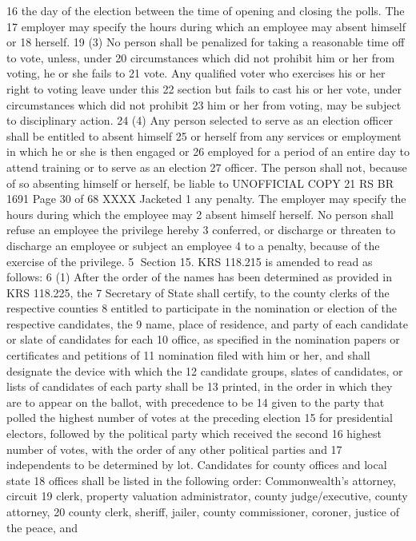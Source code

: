 16 the day of the election between the time of opening and closing the polls. The
17 employer may specify the hours during which an employee may absent himself or
18 herself.
19 (3) No person shall be penalized for taking a reasonable time off to vote, unless, under
20 circumstances which did not prohibit him or her from voting, he or she fails to
21 vote. Any qualified voter who exercises his or her right to voting leave under this
22 section but fails to cast his or her vote, under circumstances which did not prohibit
23 him or her from voting, may be subject to disciplinary action.
24 (4) Any person selected to serve as an election officer shall be entitled to absent himself
25 or herself from any services or employment in which he or she is then engaged or
26 employed for a period of an entire day to attend training or to serve as an election
27 officer. The person shall not, because of so absenting himself or herself, be liable to 
UNOFFICIAL COPY 21 RS BR 1691
Page 30 of 68
XXXX Jacketed
1 any penalty. The employer may specify the hours during which the employee may
2 absent himself herself. No person shall refuse an employee the privilege hereby
3 conferred, or discharge or threaten to discharge an employee or subject an employee
4 to a penalty, because of the exercise of the privilege.
5 Section 15. KRS 118.215 is amended to read as follows:
6 (1) After the order of the names has been determined as provided in KRS 118.225, the
7 Secretary of State shall certify, to the county clerks of the respective counties
8 entitled to participate in the nomination or election of the respective candidates, the
9 name, place of residence, and party of each candidate or slate of candidates for each
10 office, as specified in the nomination papers or certificates and petitions of
11 nomination filed with him or her, and shall designate the device with which the
12 candidate groups, slates of candidates, or lists of candidates of each party shall be
13 printed, in the order in which they are to appear on the ballot, with precedence to be
14 given to the party that polled the highest number of votes at the preceding election
15 for presidential electors, followed by the political party which received the second
16 highest number of votes, with the order of any other political parties and
17 independents to be determined by lot. Candidates for county offices and local state
18 offices shall be listed in the following order: Commonwealth's attorney, circuit
19 clerk, property valuation administrator, county judge/executive, county attorney,
20 county clerk, sheriff, jailer, county commissioner, coroner, justice of the peace, and
